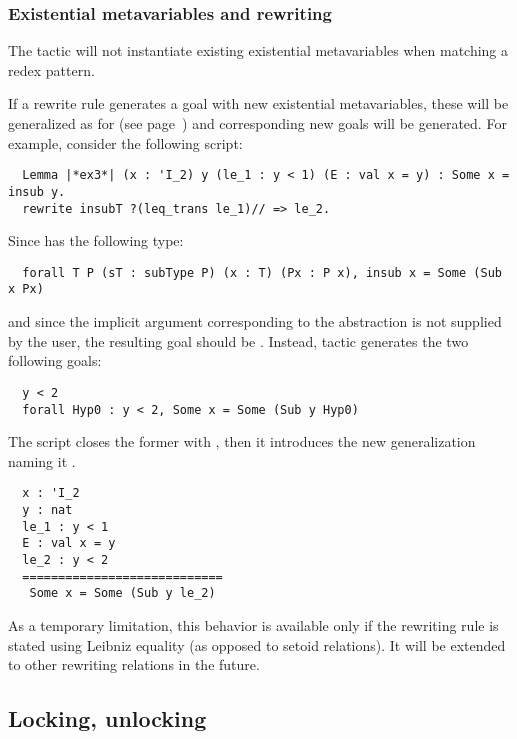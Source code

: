 \subsubsection*{Existential metavariables and rewriting}
\label{ssec:rewcaveats}
The  tactic will not instantiate existing existential
metavariables when matching a redex pattern.

If a rewrite rule generates a goal
with new existential metavariables, these will be generalized as for 
(see page~\pageref{sssec:apply}) and corresponding new goals will be generated.
For example, consider the following script:

\begin{lstlisting}
  Lemma |*ex3*| (x : 'I_2) y (le_1 : y < 1) (E : val x = y) : Some x = insub y.
  rewrite insubT ?(leq_trans le_1)// => le_2.
\end{lstlisting}

Since  has the following type:

\begin{lstlisting}
  forall T P (sT : subType P) (x : T) (Px : P x), insub x = Some (Sub x Px)
\end{lstlisting}

and since the implicit argument corresponding to the  abstraction is not
supplied by the user, the resulting goal should be . Instead, \ssr{}  tactic generates the two following
goals:
\begin{lstlisting}
  y < 2
  forall Hyp0 : y < 2, Some x = Some (Sub y Hyp0)
\end{lstlisting}
The script closes the former with , then it introduces
the new generalization naming it .

\begin{lstlisting}
  x : 'I_2
  y : nat
  le_1 : y < 1
  E : val x = y
  le_2 : y < 2
  ============================
   Some x = Some (Sub y le_2)
\end{lstlisting}

As a temporary limitation, this behavior is available only if the rewriting
rule is stated using Leibniz equality (as opposed to setoid relations).
It will be extended to other rewriting relations in the future.

\subsection{Locking, unlocking }\label{ssec:lock}

